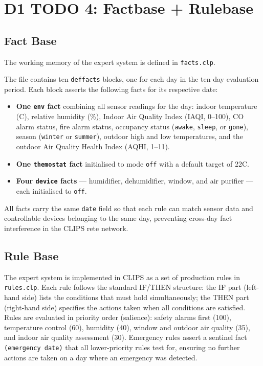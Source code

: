 \documentclass{article}
\begin{document}
\section{D1 TODO 4: Factbase + Rulebase}

\subsection{Fact Base}

The working memory of the expert system is defined in \texttt{facts.clp}.

The file contains ten \texttt{deffacts} blocks, one for each day in the ten-day evaluation period. Each block asserts the following facts for its respective date:

\begin{itemize}
    \item \textbf{One \texttt{env} fact} combining all sensor readings for the day: indoor temperature (\textdegree C), relative humidity (\%), Indoor Air Quality Index (IAQI, 0--100), CO alarm status, fire alarm status, occupancy status (\texttt{awake}, \texttt{sleep}, or \texttt{gone}), season (\texttt{winter} or \texttt{summer}), outdoor high and low temperatures, and the outdoor Air Quality Health Index (AQHI, 1--11).
    \item \textbf{One \texttt{themostat} fact} initialised to mode \texttt{off} with a default target of 22\textdegree C.
    \item \textbf{Four \texttt{device} facts} — humidifier, dehumidifier, window, and air purifier — each initialised to \texttt{off}.
\end{itemize}

All facts carry the same \texttt{date} field so that each rule can match sensor data and controllable devices belonging to the same day, preventing cross-day fact interference in the CLIPS rete network.

\subsection{Rule Base}

The expert system is implemented in CLIPS as a set of production rules in \texttt{rules.clp}. Each rule follows the standard IF/THEN structure: the IF part (left-hand side) lists the conditions that must hold simultaneously; the THEN part (right-hand side) specifies the actions taken when all conditions are satisfied. Rules are evaluated in priority order (salience): safety alarms first (100), temperature control (60), humidity (40), window and outdoor air quality (35), and indoor air quality assessment (30). Emergency rules assert a sentinel fact \texttt{(emergency date)} that all lower-priority rules test for, ensuring no further actions are taken on a day where an emergency was detected.
\end{document}
